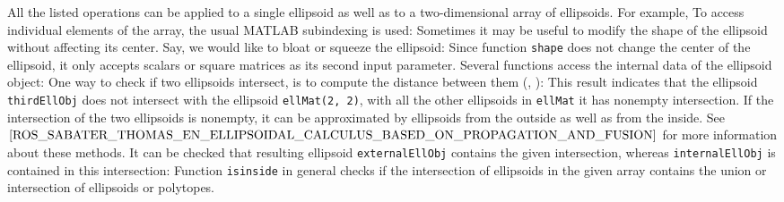 All the listed operations can be applied to a single ellipsoid as well as to
a two-dimensional array of ellipsoids.
For example,
To access individual elements of the array, the usual MATLAB subindexing
is used:
Sometimes it may be useful to modify the shape of the ellipsoid without
affecting its center. Say, we would like to bloat or squeeze the ellipsoid:
Since function {\tt shape} does not change the center of the ellipsoid,
it only accepts scalars or square matrices as its second input parameter.
Several functions  access the internal data of
the ellipsoid object:
One way to check if two ellipsoids intersect, is to compute
the distance between them (\cite{CHAN_DISTANCE_ARTICLE}, \cite{LIN_HAN_ON_DISTANCE_BETWEEN_ELLIPSOIDS}):
This result indicates that the ellipsoid {\tt thirdEllObj} does not intersect with
the ellipsoid {\tt ellMat(2, 2)}, with all the other ellipsoids in {\tt ellMat}
it has nonempty intersection. If the intersection of the two ellipsoids is
nonempty, it can be approximated by ellipsoids from the outside as well as
from the inside. See $\cite{ROS_SABATER_THOMAS_EN_ELLIPSOIDAL_CALCULUS_BASED_ON_PROPAGATION_AND_FUSION}$ for more information about these methods.
It can be checked that resulting ellipsoid {\tt externalEllObj} contains the given
intersection, whereas {\tt internalEllObj} is contained in this intersection:
Function {\tt isinside} in general checks if the intersection of ellipsoids
in the given array contains the union or intersection of ellipsoids or
polytopes.

